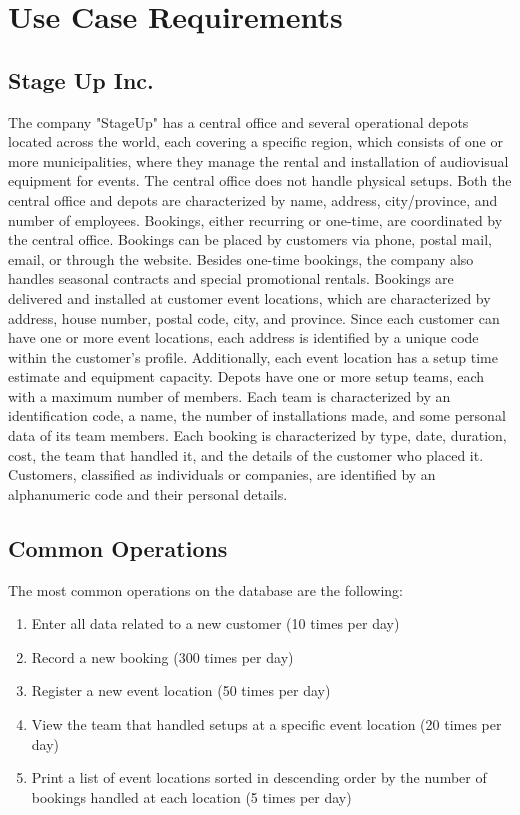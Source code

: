 \section{Use Case Requirements}

\subsection{Stage Up Inc.}

The company "StageUp" has a central office and several operational depots located across the world, each covering a specific region, which consists of one or more municipalities, where they manage the rental and installation of audiovisual equipment for events. The central office does not handle physical setups. Both the central office and depots are characterized by name, address, city/province, and number of employees. Bookings, either recurring or one-time, are coordinated by the central office. Bookings can be placed by customers via phone, postal mail, email, or through the website. Besides one-time bookings, the company also handles seasonal contracts and special promotional rentals. Bookings are delivered and installed at customer event locations, which are characterized by address, house number, postal code, city, and province. Since each customer can have one or more event locations, each address is identified by a unique code within the customer's profile. Additionally, each event location has a setup time estimate and equipment capacity. Depots have one or more setup teams, each with a maximum number of members. Each team is characterized by an identification code, a name, the number of installations made, and some personal data of its team members. Each booking is characterized by type, date, duration, cost, the team that handled it, and the details of the customer who placed it. Customers, classified as individuals or companies, are identified by an alphanumeric code and their personal details.

\subsection{Common Operations}

The most common operations on the database are the following:
\begin{enumerate}
    \item Enter all data related to a new customer (10 times per day) \label{op1}
    \item Record a new booking (300 times per day) \label{op2}
    \item Register a new event location (50 times per day) \label{op3}
    \item View the team that handled setups at a specific event location (20 times per day) \label{op4}
    \item Print a list of event locations sorted in descending order by the number of bookings handled at each location (5 times per day) \label{op5}
\end{enumerate}

